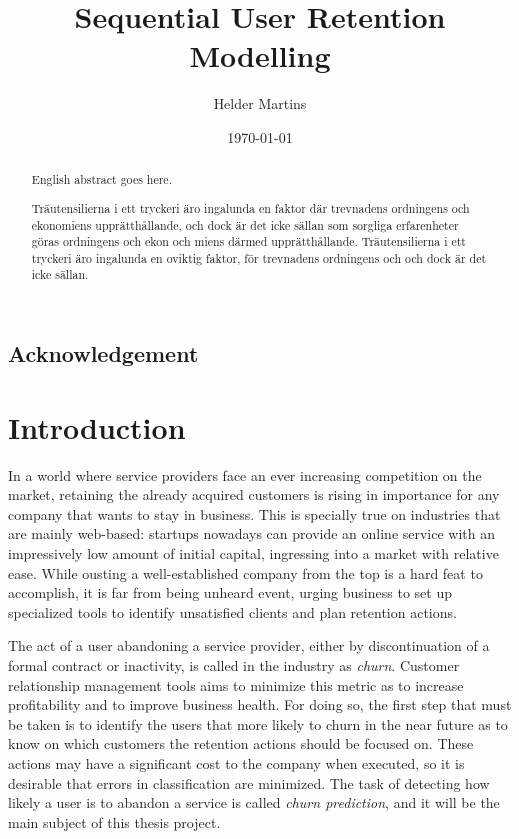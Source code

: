 \documentclass{kththesis}
\title{Sequential User Retention Modelling}
\author{Helder Martins}
\date{\today}
\begin{document}
\flyleaf

\begin{abstract}
  English abstract goes here.
\end{abstract}

\clearpage

\begin{otherlanguage}{swedish}
  \begin{abstract}
    Träutensilierna i ett tryckeri äro ingalunda en faktor där
    trevnadens ordningens och ekonomiens upprätthållande, och dock är
    det icke sällan som sorgliga erfarenheter göras ordningens och
    ekon och miens därmed upprätthållande. Träutensilierna i ett
    tryckeri äro ingalunda en oviktig faktor, för trevnadens
    ordningens och och dock är det icke sällan.
  \end{abstract}
\end{otherlanguage}

\clearpage

\section*{Acknowledgement}


\cleardoublepage

\tableofcontents

\listoffigures
 
\listoftables


\mainmatter


\chapter{Introduction}

		In a world where service providers face an ever increasing competition on the market, retaining the already acquired customers is rising in importance for any company that wants to stay in business. This is specially true on industries that are mainly web-based: startups nowadays can provide an online service with  an impressively low amount of initial capital, ingressing into a market with relative ease. While ousting a well-established company from the top is a hard feat to accomplish, it is far from being unheard event, urging business to set up specialized tools to identify unsatisfied clients and plan retention actions. 
		
	The act of a user abandoning a service provider, either by discontinuation of a formal contract or inactivity, is called in the industry as \emph{churn}. Customer relationship management tools  aims to minimize this metric as to increase profitability and to improve business health. For doing so, the first step that must be taken is to identify the users that more likely to churn in the near future as to know on which customers the retention actions should be focused on. These actions may have a significant cost to the company when executed, so it is desirable that errors in classification are minimized. The task of detecting how likely a user is to abandon a service is called \emph{churn prediction}, and it will be the main subject of this thesis project.
	
\end{document}
